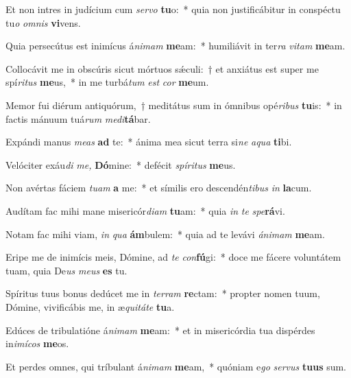 \item Et non intres in judícium cum \textit{servo} \textbf{tu}o:~* quia non justificábitur in conspé\-ctu tu\textit{o} \textit{omnis} \textbf{vi}vens.
\item Quia persecútus est inimícus á\textit{nimam} \textbf{me}am:~* humiliávit in ter\textit{ra} \textit{vitam} \textbf{me}am.
\item Collocávit me in obscúris sicut mórtuos sǽculi:~† et anxiátus est super me spí\textit{ritus} \textbf{me}us,~* in me turbá\hspace{0.03em}\textit{tum} \textit{est} \textit{cor} \textbf{me}um.
\item Memor fui diérum antiquórum,~† meditátus sum in ómnibus opé\hspace{0.02em}\textit{ribus} \textbf{tu}is:~* in factis mánuum tuá\hspace{0.02em}\textit{rum} \textit{medi}\textbf{tá}bar.
\item Expándi manus \textit{meas} \textbf{ad} te:~* ánima mea sicut terra si\textit{ne} \textit{aqua} \textbf{ti}bi.
\item Velóciter exáu\textit{di} \textit{me,} \textbf{Dó}mine:~* defécit \textit{spíritus} \textbf{me}us.
\item Non avértas fáciem \textit{tuam} \textbf{a} me:~* et símilis ero descendén\textit{tibus} \textit{in} \textbf{la}cum.
\item Audítam fac mihi mane misericór\textit{diam} \textbf{tu}am:~* quia \textit{in} \textit{te} \textit{spe}\textbf{rá}vi.
\item Notam fac mihi viam, \textit{in} \textit{qua} \textbf{ám}bulem:~* quia ad te levávi \textit{ánimam} \textbf{me}am.
\item Eripe me de inimícis meis, Dómine, ad \textit{te} \textit{con}\textbf{fú}gi:~* doce me fácere voluntátem tuam, quia De\textit{us} \textit{meus} \textbf{es} tu.
\item Spíritus tuus bonus dedúcet me in \textit{terram} \textbf{re}ctam:~* propter nomen tuum, Dómine, vivificábis me, in æ\hspace{0.02em}\textit{quitáte} \textbf{tu}a.
\item Edúces de tribulatióne á\textit{nimam} \textbf{me}am:~* et in misericórdia tua dispérdes in\textit{imícos} \textbf{me}os.
\item Et perdes omnes, qui tríbulant á\textit{nimam} \textbf{me}am,~* quóniam e\textit{go} \textit{servus} \textbf{tu}\textbf{us} sum.
